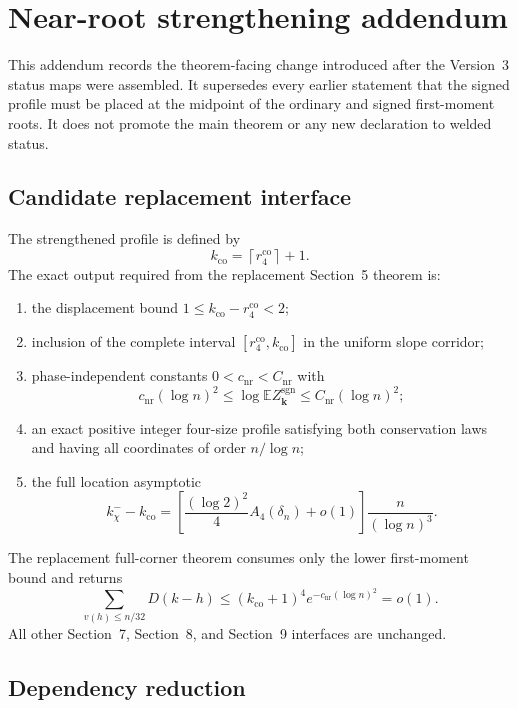 \section{Near-root strengthening addendum}
\label{app:near-root-strengthening-v4}

This addendum records the theorem-facing change introduced after the Version~3
status maps were assembled. It supersedes every earlier statement that the
signed profile must be placed at the midpoint of the ordinary and signed
first-moment roots. It does not promote the main theorem or any new declaration
to welded status.

\subsection{Candidate replacement interface}

The strengthened profile is defined by
\[
  k_{\mathrm{co}}
  =\left\lceil r_4^{\mathrm{co}}\right\rceil+1.
\]
The exact output required from the replacement Section~5 theorem is:
\begin{enumerate}
\item the displacement bound
$1\le k_{\mathrm{co}}-r_4^{\mathrm{co}}<2$;
\item inclusion of the complete interval
$[r_4^{\mathrm{co}},k_{\mathrm{co}}]$ in the uniform slope corridor;
\item phase-independent constants $0<c_{\mathrm{nr}}<C_{\mathrm{nr}}$ with
\[
  c_{\mathrm{nr}}(\log n)^2
  \le
  \log\mathbb E Z_{\mathbf k}^{\mathrm{sgn}}
  \le
  C_{\mathrm{nr}}(\log n)^2;
\]
\item an exact positive integer four-size profile satisfying both conservation
laws and having all coordinates of order $n/\log n$;
\item the full location asymptotic
\[
  k_\chi^- - k_{\mathrm{co}}
  =
  \left[
    \frac{(\log 2)^2}{4}A_4(\delta_n)+o(1)
  \right]
  \frac{n}{(\log n)^3}.
\]
\end{enumerate}

The replacement full-corner theorem consumes only the lower first-moment bound
and returns
\[
  \sum_{v(h)\le n/32}D(k-h)
  \le
  (k_{\mathrm{co}}+1)^4
  e^{-c_{\mathrm{nr}}(\log n)^2}
  =o(1).
\]
All other Section~7, Section~8, and Section~9 interfaces are unchanged.

\subsection{Dependency reduction}

